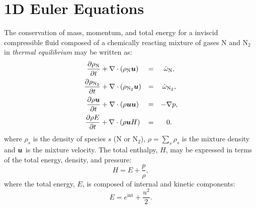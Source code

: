 \documentclass[10pt]{article}
\newcommand{\diff}[2] {\dfrac{\partial #1 }{\partial #2}}
\newcommand{\bv}[1]{\ensuremath{\mbox{\boldmath$ #1 $}}}
\begin{document}
\section{1D Euler Equations}
The conservation of mass, momentum, and total energy for a inviscid compressible fluid composed of a chemically reacting mixture of gases N and N$_2$ in \textit{thermal equilibrium} may be written as:
\begin{equation}
\label{eq:euler01}
\begin{array}{ccc}
\diff{\rho_{\text{N}}}{t}+\nabla \cdot \left(\rho_{\text{N}} \bv{u}\right) &=& \dot{\omega}_{\text{N}},\vspace{5pt} \\
\diff{\rho_{\text{N}_2}}{t}+\nabla \cdot \left(\rho_{\text{N}_2}\bv{u}\right) &=& \dot{\omega}_{\text{N}_2},\vspace{5pt} \\
\diff{\rho\bv{u}}{t}+\nabla\cdot\left(\rho\bv{u}\bv{u}\right) &=& -\nabla p,\vspace{5pt} \\
\diff{\rho E}{t}+\nabla\cdot\left(\rho \bv{u} H\right) &=& 0.
\end{array}
\end{equation}
%
%
where $\rho_s$ is the density of species $s$ (N or N$_2$), $\rho=\sum_s \rho_s$ is the mixture density and  $ \bv{u} $ is the mixture velocity. %
%
The total enthalpy, $H$, may be expressed in terms of the total energy, density, and pressure:
$$H = E + \dfrac{p}{\rho},$$
where the total energy, $E$, is composed of internal and kinetic components: $$E = e^{\text{int}} + \dfrac{ u^2 }{2}.$$
\end{document}

